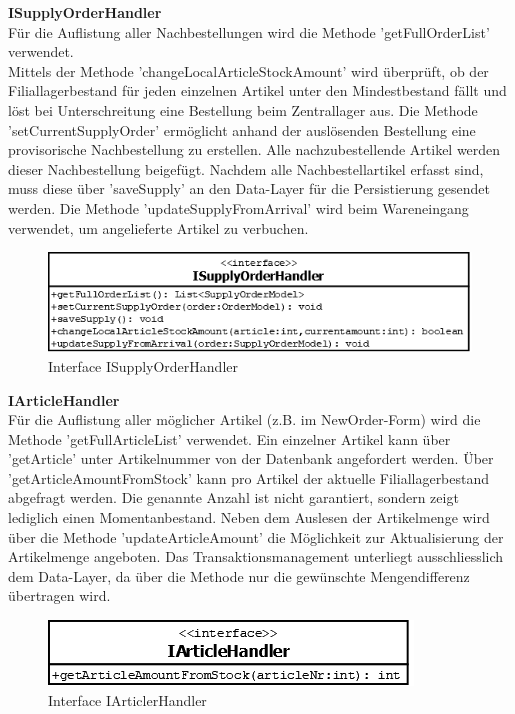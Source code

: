 \textbf{ISupplyOrderHandler}\\
Für die Auflistung aller Nachbestellungen wird die Methode 'getFullOrderList' verwendet.\\
Mittels der Methode 'changeLocalArticleStockAmount' wird überprüft, ob der Filiallagerbestand für jeden einzelnen Artikel unter den Mindestbestand fällt und löst bei Unterschreitung eine Bestellung beim Zentrallager aus. Die Methode 'setCurrentSupplyOrder' ermöglicht anhand der auslösenden Bestellung eine provisorische Nachbestellung zu erstellen. Alle nachzubestellende Artikel werden dieser Nachbestellung beigefügt. Nachdem alle Nachbestellartikel erfasst sind, muss diese über 'saveSupply' an den Data-Layer für die Persistierung gesendet werden. Die Methode 'updateSupplyFromArrival' wird beim Wareneingang verwendet, um angelieferte Artikel zu verbuchen. 
\begin{figure}[H]
	\includegraphics[width=0.6\linewidth]{Images/ISupplyOrderHandler}
	\caption{Interface ISupplyOrderHandler}
	\label{fig:if-ISupplyOrderHandler}
\end{figure}



\textbf{IArticleHandler}\\
Für die Auflistung aller möglicher Artikel (z.B. im NewOrder-Form) wird die Methode 'getFullArticleList' verwendet. Ein einzelner Artikel kann über 'getArticle' unter Artikelnummer von der Datenbank angefordert werden. Über 'getArticleAmountFromStock' kann pro Artikel der aktuelle Filiallagerbestand abgefragt werden. Die genannte Anzahl ist nicht garantiert, sondern zeigt lediglich einen Momentanbestand. Neben dem Auslesen der Artikelmenge wird über die Methode 'updateArticleAmount' die Möglichkeit zur Aktualisierung der Artikelmenge angeboten. Das Transaktionsmanagement unterliegt ausschliesslich dem Data-Layer, da über die Methode nur die gewünschte Mengendifferenz übertragen wird.
\begin{figure}[H]
	\includegraphics[width=0.6\linewidth]{Images/IArticleHandler}
	\caption{Interface IArticlerHandler}
	\label{fig:if-IArticleHandler}
\end{figure}

